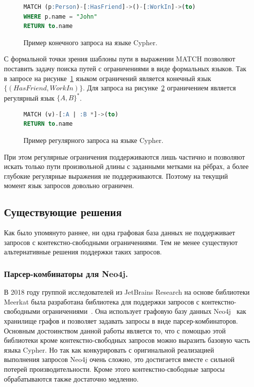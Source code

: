 
\begin{figure}[h]
\begin{lstlisting}[language=sql]
MATCH (p:Person)-[:HasFriend]->()-[:WorkIn]->(to)
WHERE p.name = "John"
RETURN to.name
\end{lstlisting}
\caption{Пример конечного запроса на языке Cypher.}
\label{code:cypher_query}
\end{figure}

С формальной точки зрения шаблоны пути в выражении MATCH позволяют поставить задачу поиска путей с ограничениями в виде формальных языков. Так в запросе на рисунке~\ref{code:cypher_query} языком ограничений является конечный язык $\{(HasFriend, WorkIn)\}$. Для запроса на рисунке~\ref{code:cypher_query_2} ограничением является регулярный язык $\{A, B\}^*$. 

\begin{figure}[h]
\begin{lstlisting}[language=sql]
MATCH (v)-[:A | :B *]->(to)
RETURN to.name
\end{lstlisting}
\caption{Пример регулярного запроса на языке Cypher.}
\label{code:cypher_query_2}
\end{figure}

При этом регулярные ограничения поддерживаются лишь частично и позволяют искать только пути произвольной длины с заданными метками на рёбрах, а более глубокие регулярные выражения не поддерживаются. Поэтому на текущий момент язык запросов довольно ограничен.

\subsection{Существующие решения}
Как было упомянуто раннее, ни одна графовая база данных не поддерживает запросов с контекстно-свободными ограничениями. Тем не менее существуют альтернативные решения поддержки таких запросов. 

\subsubsection{Парсер-комбинаторы для Neo4j.}\label{sec:pareser-combinators}
В 2018 году группой исследователей из JetBrains Research на основе библиотеки Meerkat была разработана библиотека для поддержки запросов с контекстно-свободными ограничениями~\cite{parser-combinators}. Она использует графовую базу данных Neo4j~\cite{neo4j} как хранилище графов и позволяет задавать запросы в виде парсер-комбинаторов. Основным достоинством данной работы является то, что с помощью этой библиотеки кроме контекстно-свободных запросов можно выразить базовую часть языка Cypher. Но так как конкурировать с оригинальной реализацией выполнения запросов Neo4j очень сложно, это достигается вместе c сильной потерей производительности. Кроме этого контекстно-свободные запросы обрабатываются также достаточно медленно.

